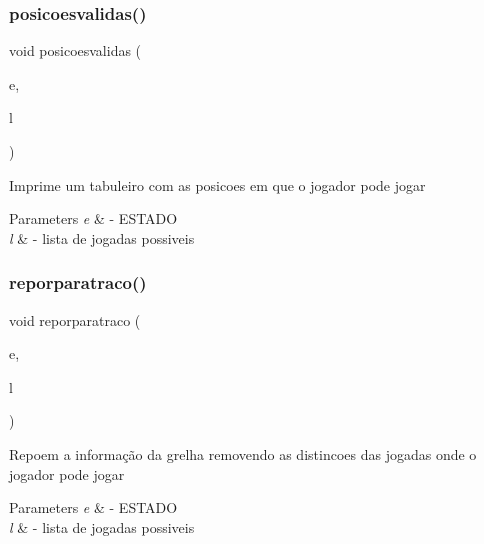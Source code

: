 \subsubsection{posicoesvalidas()}
{\footnotesize\ttfamily void posicoesvalidas (\begin{DoxyParamCaption}\item[{\textbf{ E\+S\+T\+A\+DO} $\ast$}]{e,  }\item[{\textbf{ Ltpl}}]{l }\end{DoxyParamCaption})}

Imprime um tabuleiro com as posicoes em que o jogador pode jogar 
\begin{DoxyParams}{Parameters}
{\em e} & -\/ E\+S\+T\+A\+DO \\
\hline
{\em l} & -\/ lista de jogadas possiveis \\
\hline
\end{DoxyParams}
\mbox{\label{valid_8c_a14c920dad0e3341ff22d3ffedb821549}} 
\subsubsection{reporparatraco()}
{\footnotesize\ttfamily void reporparatraco (\begin{DoxyParamCaption}\item[{\textbf{ E\+S\+T\+A\+DO} $\ast$}]{e,  }\item[{\textbf{ Ltpl}}]{l }\end{DoxyParamCaption})}

Repoem a informação da grelha removendo as distincoes das jogadas onde o jogador pode jogar 
\begin{DoxyParams}{Parameters}
{\em e} & -\/ E\+S\+T\+A\+DO \\
\hline
{\em l} & -\/ lista de jogadas possiveis \\
\hline
\end{DoxyParams}
